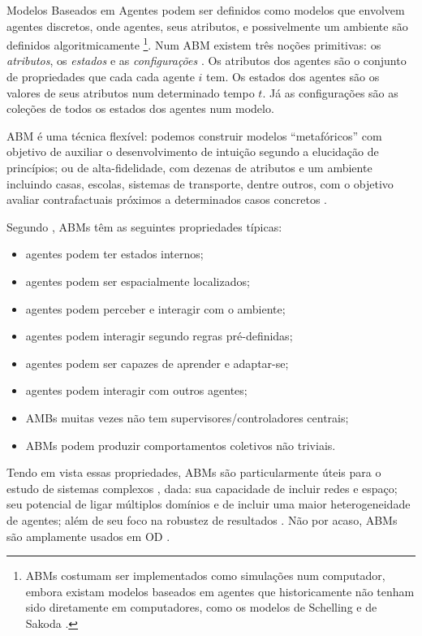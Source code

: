 Modelos Baseados em Agentes podem ser definidos como modelos que envolvem
agentes discretos, onde agentes, seus atributos, e possivelmente um ambiente são
definidos algoritmicamente \cite{sayama2015introduction} \footnote{ ABMs
  costumam ser implementados como simulações num computador, embora existam
  modelos baseados em agentes que historicamente não tenham sido diretamente em
  computadores, como os modelos de Schelling e de Sakoda
  \cite{hegselmann2017thomas}.}. Num ABM existem três noções primitivas: os
\textit{atributos}, os \textit{estados} e as \textit{configurações}
\cite{de2014agent}. Os atributos dos agentes são o conjunto de propriedades
que cada cada agente \(i\) tem. Os estados dos agentes são os valores de seus
atributos num determinado tempo \(t\). Já as configurações são as coleções de
todos os estados dos agentes num modelo.

ABM é uma técnica flexível: podemos construir modelos ``metafóricos'' com
objetivo de auxiliar o desenvolvimento de intuição segundo a elucidação de
princípios; ou de alta-fidelidade, com dezenas de atributos e um
ambiente incluindo casas, escolas, sistemas de transporte, dentre outros, com o
objetivo avaliar contrafactuais próximos a determinados casos concretos
\cite{de2014agent, epstein2006generative}.


Segundo , ABMs têm as seguintes
propriedades típicas:
\begin{itemize}
\item agentes podem ter estados internos;
\item agentes podem ser espacialmente localizados;
\item agentes podem perceber e interagir com o ambiente;
\item agentes podem interagir segundo regras pré-definidas;
\item agentes podem ser capazes de aprender e adaptar-se;
\item agentes podem interagir com outros agentes;
\item AMBs muitas vezes não tem supervisores/controladores centrais;
  \item ABMs podem produzir comportamentos coletivos não triviais.
  \end{itemize}

  Tendo em vista essas propriedades, ABMs são particularmente úteis para o
  estudo de sistemas complexos \cite{wilensky2015introduction}, dada: sua
  capacidade de incluir redes e espaço; seu potencial de ligar múltiplos
  domínios e de incluir uma maior heterogeneidade de agentes; além de seu foco
  na robustez de resultados \cite{de2014agent,wilensky2015introduction}. Não por
  acaso, ABMs são amplamente usados em OD  \cite{castellano2012social,flache2017}.

